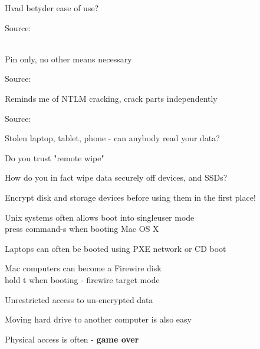 \documentclass[20pt,landscape,a4paper,footrule]{foils}
\begin{document}
\centerline{Hvad betyder ease of use?}

Source: \\
\\
{\footnotesize {}}



\centerline{Pin only, no other means necessary}

Source:\\





\centerline{Reminds me of NTLM cracking, crack parts independently}

Source:\\





\begin{list1}
\item Stolen laptop, tablet, phone - can anybody read your data?
\item Do you trust "remote wipe"
\item How do you in fact wipe data securely off devices, and SSDs?
\item Encrypt disk and storage devices before using them in the first place!
\end{list1}


\begin{list1}
\item Unix systems often allows boot into singleuser mode\\
press command-s when booting Mac OS X
\item Laptops can often be booted using PXE network or CD boot
\item Mac computers can become a Firewire disk\\
hold t when booting - firewire target mode
\item Unrestricted access to un-encrypted data
\item Moving hard drive to another computer is also easy
\end{list1}
\pause
\centerline{Physical access is often - {\bf game over}}
\end{document}
